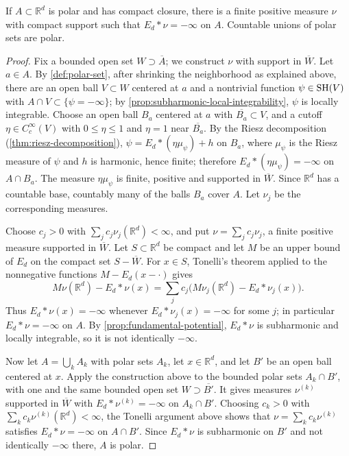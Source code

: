 \begin{proposition}\label{prop:polar-globalization}
If $A\subset\mathbb R^d$ is polar and has compact closure, there is a finite positive measure $\nu$ with compact support such that $E_d*\nu=-\infty$ on $A$. Countable unions of polar sets are polar.
\end{proposition}
\begin{proof}
Fix a bounded open set $W\supset\overline A$; we construct $\nu$ with support in $\overline W$. Let $a\in A$. By \cref{def:polar-set}, after shrinking the neighborhood as explained above, there are an open ball $V\subset W$ centered at $a$ and a nontrivial function $\psi\in\mathrm{SH}(V)$ with $A\cap V\subset\{\psi=-\infty\}$; by \cref{prop:subharmonic-local-integrability}, $\psi$ is locally integrable. Choose an open ball $B_a$ centered at $a$ with $\overline{B_a}\subset V$, and a cutoff $\eta\in C_c^\infty(V)$ with $0\leq\eta\leq1$ and $\eta=1$ near $\overline{B_a}$. By the Riesz decomposition (\cref{thm:riesz-decomposition}), $\psi=E_d*(\eta\mu_\psi)+h$ on $B_a$, where $\mu_\psi$ is the Riesz measure of $\psi$ and $h$ is harmonic, hence finite; therefore $E_d*(\eta\mu_\psi)=-\infty$ on $A\cap B_a$. The measure $\eta\mu_\psi$ is finite, positive and supported in $\overline W$. Since $\mathbb R^d$ has a countable base, countably many of the balls $B_a$ cover $A$. Let $\nu_j$ be the corresponding measures.

Choose $c_j>0$ with $\sum_jc_j\nu_j(\mathbb R^d)<\infty$, and put $\nu=\sum_jc_j\nu_j$, a finite positive measure supported in $\overline W$. Let $S\subset\mathbb R^d$ be compact and let $M$ be an upper bound of $E_d$ on the compact set $S-\overline W$. For $x\in S$, Tonelli's theorem applied to the nonnegative functions $M-E_d(x-\cdot)$ gives
\[
 M\nu(\mathbb R^d)-E_d*\nu(x)=\sum_jc_j\bigl(M\nu_j(\mathbb R^d)-E_d*\nu_j(x)\bigr).
\]
Thus $E_d*\nu(x)=-\infty$ whenever $E_d*\nu_j(x)=-\infty$ for some $j$; in particular $E_d*\nu=-\infty$ on $A$. By \cref{prop:fundamental-potential}, $E_d*\nu$ is subharmonic and locally integrable, so it is not identically $-\infty$.

Now let $A=\bigcup_kA_k$ with polar sets $A_k$, let $x\in\mathbb R^d$, and let $B'$ be an open ball centered at $x$. Apply the construction above to the bounded polar sets $A_k\cap B'$, with one and the same bounded open set $W\supset\overline{B'}$. It gives measures $\nu^{(k)}$ supported in $\overline W$ with $E_d*\nu^{(k)}=-\infty$ on $A_k\cap B'$. Choosing $c_k>0$ with $\sum_kc_k\nu^{(k)}(\mathbb R^d)<\infty$, the Tonelli argument above shows that $\nu=\sum_kc_k\nu^{(k)}$ satisfies $E_d*\nu=-\infty$ on $A\cap B'$. Since $E_d*\nu$ is subharmonic on $B'$ and not identically $-\infty$ there, $A$ is polar.
\end{proof}

